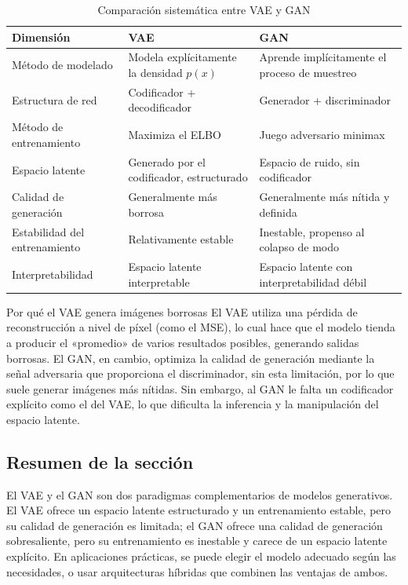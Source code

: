 \documentclass[a4paper]{article}
\begin{document}
\begin{table}[H]
\centering
\caption{Comparación sistemática entre VAE y GAN}
\begin{tabular}{lll}
\toprule
\textbf{Dimensión} & \textbf{VAE} & \textbf{GAN} \\
\midrule
Método de modelado & Modela explícitamente la densidad $p(x)$ & Aprende implícitamente el proceso de muestreo \\
Estructura de red & Codificador + decodificador & Generador + discriminador \\
Método de entrenamiento & Maximiza el ELBO & Juego adversario minimax \\
Espacio latente & Generado por el codificador, estructurado & Espacio de ruido, sin codificador \\
Calidad de generación & Generalmente más borrosa & Generalmente más nítida y definida \\
Estabilidad del entrenamiento & Relativamente estable & Inestable, propenso al colapso de modo \\
Interpretabilidad & Espacio latente interpretable & Espacio latente con interpretabilidad débil \\
\bottomrule
\end{tabular}
\end{table}

\begin{warningbox}{Por qué el VAE genera imágenes borrosas}
El VAE utiliza una pérdida de reconstrucción a nivel de píxel (como el MSE), lo cual hace que el modelo tienda a producir el «promedio» de varios resultados posibles, generando salidas borrosas. El GAN, en cambio, optimiza la calidad de generación mediante la señal adversaria que proporciona el discriminador, sin esta limitación, por lo que suele generar imágenes más nítidas. Sin embargo, al GAN le falta un codificador explícito como el del VAE, lo que dificulta la inferencia y la manipulación del espacio latente.
\end{warningbox}

\subsection{Resumen de la sección}

El VAE y el GAN son dos paradigmas complementarios de modelos generativos. El VAE ofrece un espacio latente estructurado y un entrenamiento estable, pero su calidad de generación es limitada; el GAN ofrece una calidad de generación sobresaliente, pero su entrenamiento es inestable y carece de un espacio latente explícito. En aplicaciones prácticas, se puede elegir el modelo adecuado según las necesidades, o usar arquitecturas híbridas que combinen las ventajas de ambos.
\end{document}
